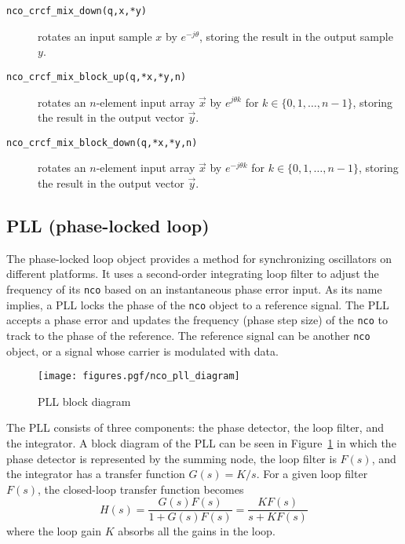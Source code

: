 \begin{description}
\item[{\tt nco\_crcf\_mix\_down(q,x,*y)}]
    rotates an input sample $x$ by $e^{-j\theta}$, storing the result in
    the output sample $y$.
\item[{\tt nco\_crcf\_mix\_block\_up(q,*x,*y,n)}]
    rotates an $n$-element input array $\vec{x}$ by $e^{j\theta k}$
    for $k \in \{0,1,\ldots,n-1\}$, storing the result in
    the output vector $\vec{y}$.
\item[{\tt nco\_crcf\_mix\_block\_down(q,*x,*y,n)}]
    rotates an $n$-element input array $\vec{x}$ by $e^{-j\theta k}$
    for $k \in \{0,1,\ldots,n-1\}$, storing the result in
    the output vector $\vec{y}$.
\end{description}

\subsection{PLL (phase-locked loop)}
\label{module:nco:pll}
The phase-locked loop object provides a method for synchronizing oscillators
on different platforms.
It uses a second-order integrating loop filter to adjust the frequency of its
{\tt nco} based on an instantaneous phase error input.
As its name implies, a PLL locks the phase of the {\tt nco} object to a
reference signal.
The PLL accepts a phase error and updates the frequency (phase step size) of
the {\tt nco} to track to the phase of the reference.
The reference signal can be another {\tt nco} object, or a signal whose
carrier is modulated with data.

\begin{figure}
\centering
  \texttt{[image: figures.pgf/nco\_pll\_diagram]}
\caption{PLL block diagram}
\label{fig:module:nco:pll_diagram}
\end{figure}

The PLL consists of three components: the phase detector, the loop filter, and
the integrator.
A block diagram of the PLL can be seen in
Figure~\ref{fig:module:nco:pll_diagram} in which the phase detector is
represented by the summing node, the loop filter is $F(s)$, and the integrator
has a transfer function $G(s) = K/s$.
For a given loop filter $F(s)$, the closed-loop transfer function becomes
\[
    H(s) = \frac{ G(s)F(s) }{ 1 + G(s)F(s) }
         = \frac{ KF(s)    }{ s + KF(s)    }
\]
where the loop gain $K$ absorbs all the gains in the loop.

